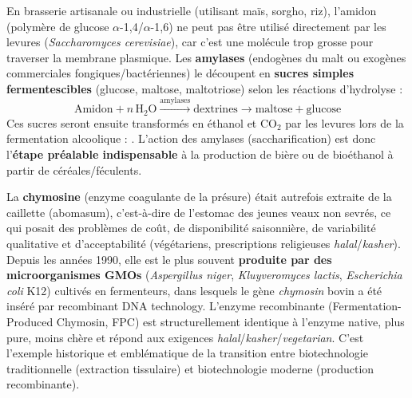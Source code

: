 \documentclass[11pt]{article}
\begin{document}
\begin{exemplebox}
En brasserie artisanale ou industrielle (utilisant maïs, sorgho, riz), l'amidon (polymère de glucose $\alpha$-1,4/$\alpha$-1,6) ne peut pas être utilisé directement par les levures (\emph{Saccharomyces cerevisiae}), car c'est une molécule trop grosse pour traverser la membrane plasmique. Les \textbf{amylases} (endogènes du malt ou exogènes commerciales fongiques/bactériennes) le découpent en \textbf{sucres simples fermentescibles} (glucose, maltose, maltotriose) selon les réactions d'hydrolyse :
\[ \text{Amidon} + n\,\text{H}_2\text{O} \xrightarrow{\text{amylases}} \text{dextrines} \rightarrow \text{maltose} + \text{glucose} \]
Ces sucres seront ensuite transformés en éthanol et $\text{CO}_2$ par les levures lors de la fermentation alcoolique : . L'action des amylases (saccharification) est donc l'\textbf{étape préalable indispensable} à la production de bière ou de bioéthanol à partir de céréales/féculents.
\end{exemplebox}

\begin{savaistu}
La \textbf{chymosine} (enzyme coagulante de la présure) était autrefois extraite de la caillette (abomasum), c'est-à-dire de l'estomac des jeunes veaux non sevrés, ce qui posait des problèmes de coût, de disponibilité saisonnière, de variabilité qualitative et d'acceptabilité (végétariens, prescriptions religieuses \emph{halal}/\emph{kasher}). Depuis les années 1990, elle est le plus souvent \textbf{produite par des microorganismes GMOs} (\emph{Aspergillus niger}, \emph{Kluyveromyces lactis}, \emph{Escherichia coli} K12) cultivés en fermenteurs, dans lesquels le gène \emph{chymosin} bovin a été inséré par recombinant DNA technology. L'enzyme recombinante (Fermentation-Produced Chymosin, FPC) est structurellement identique à l'enzyme native, plus pure, moins chère et répond aux exigences \emph{halal}/\emph{kasher}/\emph{vegetarian}. C'est l'exemple historique et emblématique de la transition entre biotechnologie traditionnelle (extraction tissulaire) et biotechnologie moderne (production recombinante).
\end{savaistu}
\end{document}
